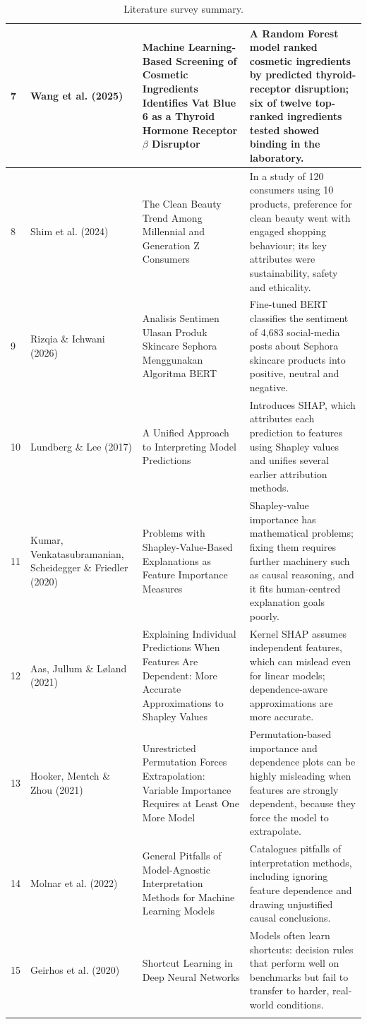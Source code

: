 \documentclass[11pt,a4paper]{article}
\begin{document}
\begin{longtable}{|p{0.6cm}|p{3.0cm}|p{5.0cm}|p{6.1cm}|}
7 & Wang et al. (2025) & Machine Learning-Based Screening of Cosmetic Ingredients Identifies Vat Blue 6 as a Thyroid Hormone Receptor $\beta$ Disruptor & A Random Forest model ranked cosmetic ingredients by predicted thyroid-receptor disruption; six of twelve top-ranked ingredients tested showed binding in the laboratory. \\ \hline
8 & Shim et al. (2024) & The Clean Beauty Trend Among Millennial and Generation Z Consumers & In a study of 120 consumers using 10 products, preference for clean beauty went with engaged shopping behaviour; its key attributes were sustainability, safety and ethicality. \\ \hline
9 & Rizqia \& Ichwani (2026) & Analisis Sentimen Ulasan Produk Skincare Sephora Menggunakan Algoritma BERT & Fine-tuned BERT classifies the sentiment of 4,683 social-media posts about Sephora skincare products into positive, neutral and negative. \\ \hline
10 & Lundberg \& Lee (2017) & A Unified Approach to Interpreting Model Predictions & Introduces SHAP, which attributes each prediction to features using Shapley values and unifies several earlier attribution methods. \\ \hline
11 & Kumar, Venkatasubramanian, Scheidegger \& Friedler (2020) & Problems with Shapley-Value-Based Explanations as Feature Importance Measures & Shapley-value importance has mathematical problems; fixing them requires further machinery such as causal reasoning, and it fits human-centred explanation goals poorly. \\ \hline
12 & Aas, Jullum \& L{\o}land (2021) & Explaining Individual Predictions When Features Are Dependent: More Accurate Approximations to Shapley Values & Kernel SHAP assumes independent features, which can mislead even for linear models; dependence-aware approximations are more accurate. \\ \hline
13 & Hooker, Mentch \& Zhou (2021) & Unrestricted Permutation Forces Extrapolation: Variable Importance Requires at Least One More Model & Permutation-based importance and dependence plots can be highly misleading when features are strongly dependent, because they force the model to extrapolate. \\ \hline
14 & Molnar et al. (2022) & General Pitfalls of Model-Agnostic Interpretation Methods for Machine Learning Models & Catalogues pitfalls of interpretation methods, including ignoring feature dependence and drawing unjustified causal conclusions. \\ \hline
15 & Geirhos et al. (2020) & Shortcut Learning in Deep Neural Networks & Models often learn shortcuts: decision rules that perform well on benchmarks but fail to transfer to harder, real-world conditions. \\ \hline
\caption{Literature survey summary.}
\label{tab:survey}
\end{longtable}
\endgroup
\end{document}
